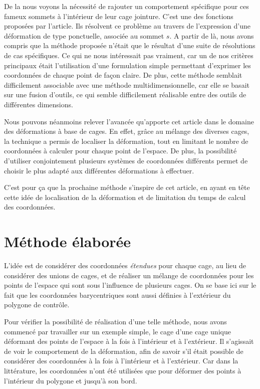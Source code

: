 De la nous voyons la nécessité de rajouter un comportement spécifique
pour ces fameux sommets à l'intérieur de leur cage jointure. C'est une
des fonctions proposées par l'article. Ils résolvent ce problème au
travers de l'expression d'une déformation de type ponctuelle, associée
au sommet $s$. A partir de là, nous avons compris que la méthode
proposée \cite{GPCP13} n'était que le résultat d'une suite de
résolutions de cas spécifiques. Ce qui ne nous intéressait pas
vraiment, car un de nos critères principaux était l'utilisation d'une
formulation simple permettant d'exprimer les coordonnées de chaque
point de façon claire. De plus, cette méthode semblait difficilement
associable avec une méthode multidimensionnelle, car elle se basait
sur une fusion d'outils, ce qui semble difficilement réalisable entre
des outils de différentes dimensions.

Nous pouvons néanmoins relever l'avancée qu'apporte cet article dans
le domaine des déformations à base de cages. En effet, grâce au
mélange des diverses cages, la technique a permis de localiser la
déformation, tout en limitant le nombre de coordonnées à calculer pour
chaque point de l'espace. De plus, la possibilité d'utiliser
conjointement plusieurs systèmes de coordonnées différents permet de
choisir le plus adapté aux différentes déformations à effectuer.

C'est pour ça que la prochaine méthode s'inspire de cet article, en
ayant en tête cette idée de localisation de la déformation et de
limitation du temps de calcul des coordonnées.

\section{Méthode élaborée}
L'idée est de considérer des coordonnées \textit{étendues} pour chaque
cage, au lieu de considérer des unions de cages, et de réaliser un
mélange de coordonnées pour les points de l'espace qui sont sous
l'influence de plusieurs cages. On se base ici sur le fait que les
coordonnées barycentriques sont aussi définies à l'extérieur du
polygone de contrôle.

Pour vérifier la possibilité de réalisation d'une telle méthode, nous
avons commencé par travailler sur un exemple simple, le cage d'une
cage unique déformant des points de l'espace à la fois à l'intérieur
et à l'extérieur. Il s'agissait de voir le comportement de la
déformation, afin de savoir s'il était possible de considérer des
coordonnées à la fois à l'intérieur et à l'extérieur. Car dans la
littérature, les coordonnées n'ont été utilisées que pour déformer des
points à l'intérieur du polygone et jusqu'à son bord.




